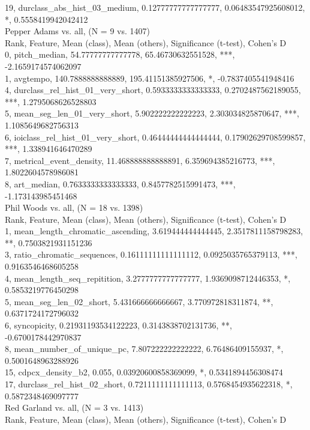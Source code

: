19, durclass_abs_hist_03_medium, 0.12777777777777777, 0.06483547925608012, *, 0.5558419942042412\\
Pepper Adams vs. all, (N = 9 vs. 1407)\\
Rank, Feature, Mean (class), Mean (others), Significance (t-test), Cohen's D\\
0, pitch_median, 54.77777777777778, 65.46730632551528, ***, -2.1659174574062097\\
1, avgtempo, 140.7888888888889, 195.41151385927506, *, -0.7837405541948416\\
4, durclass_rel_hist_01_very_short, 0.5933333333333333, 0.2702487562189055, ***, 1.2795068626528803\\
5, mean_seg_len_01_very_short, 5.902222222222223, 2.303034825870647, ***, 1.1085649682756313\\
6, ioiclass_rel_hist_01_very_short, 0.46444444444444444, 0.17902629708599857, ***, 1.338941646470289\\
7, metrical_event_density, 11.468888888888891, 6.359694385216773, ***, 1.8022604578986081\\
8, art_median, 0.7633333333333333, 0.8457782515991473, ***, -1.173143985451468\\
Phil Woods vs. all, (N = 18 vs. 1398)\\
Rank, Feature, Mean (class), Mean (others), Significance (t-test), Cohen's D\\
1, mean_length_chromatic_ascending, 3.619444444444445, 2.3517811158798283, **, 0.7503821931151236\\
3, ratio_chromatic_sequences, 0.16111111111111112, 0.0925035765379113, ***, 0.9163546468605258\\
4, mean_length_seq_repitition, 3.2777777777777777, 1.9369098712446353, *, 0.5853219776450298\\
5, mean_seg_len_02_short, 5.431666666666667, 3.770972818311874, **, 0.6371724172796032\\
6, syncopicity, 0.21931193534122223, 0.3143838702131736, **, -0.6700178442970837\\
8, mean_number_of_unique_pc, 7.807222222222222, 6.76486409155937, *, 0.5001648963288926\\
15, cdpcx_density_b2, 0.055, 0.03920600858369099, *, 0.5341894456308474\\
17, durclass_rel_hist_02_short, 0.7211111111111113, 0.5768454935622318, *, 0.5872348469097777\\
Red Garland vs. all, (N = 3 vs. 1413)\\
Rank, Feature, Mean (class), Mean (others), Significance (t-test), Cohen's D\\
